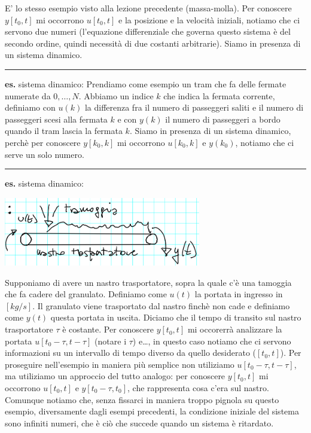 E' lo stesso esempio visto alla lezione precedente (massa-molla). Per conoscere $y[t_0,t]$ mi occorrono $u[t_0,t]$ e la posizione e la velocità iniziali, notiamo che ci servono due numeri (l'equazione differenziale che governa questo sistema è del secondo ordine, quindi necessità di due costanti arbitrarie). Siamo in presenza di un sistema dinamico.\newline
\rule{\textwidth}{0,4pt}\newline
\newline
\textbf{es.} sistema dinamico:\newline
Prendiamo come esempio un tram che fa delle fermate numerate da $0, \dots, N$. Abbiamo un indice $k$ che indica la fermata corrente, definiamo con $u(k)$ la differenza fra il numero di passeggeri saliti e il numero di passeggeri scesi alla fermata $k$ e con $y(k)$ il numero di passeggeri a bordo quando il tram lascia la fermata $k$. Siamo in presenza di un sistema dinamico, perchè per conoscere $y[k_0,k]$ mi occorrono $u[k_0,k]$ e $y(k_0)$, notiamo che ci serve un solo numero.\newline
\rule{\textwidth}{0,4pt}\newline
\newline
\textbf{es.} sistema dinamico:
\begin{center}
    \includegraphics[height=3cm]{../lezione2/img5.PNG}
\end{center}
Supponiamo di avere un nastro trasportatore, sopra la quale c'è una tamoggia che fa cadere del granulato. Definiamo come $u(t)$ la portata in ingresso in $[kg/s]$. Il granulato viene trasportato dal nastro finchè non cade e definiamo come $y(t)$ questa portata in uscita. Diciamo che il tempo di transito sul nastro trasportatore $\tau$ è costante.\newline
Per conoscere $y[t_0,t]$ mi occorerrà analizzare la portata $u[t_0-\tau,t-\tau]$ (notare i $\tau$) e\dots, in questo caso notiamo che ci servono informazioni su un intervallo di tempo diverso da quello desiderato ($[t_0,t]$). Per proseguire nell'esempio in maniera più semplice non utiliziamo $u[t_0-\tau,t-\tau]$, ma utiliziamo un approccio del tutto analogo: per conoscere $y[t_0,t]$ mi occorrono $u[t_0,t]$ e $y[t_0-\tau,t_0]$, che rappresenta cosa c'era sul nastro. Comunque notiamo che, senza fissarci in maniera troppo pignola su questo esempio, diversamente dagli esempi precedenti, la condizione iniziale del sistema sono infiniti numeri, che è ciò che succede quando un sistema è ritardato.\newline
